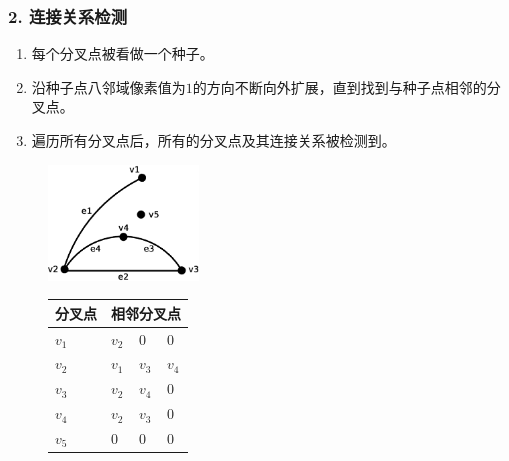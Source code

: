 \documentclass[notheorems,mathserif,table,compress]{beamer}  %
\begin{document}
\begin{frame}
\frametitle{2. 连接关系检测}
\begin{enumerate}
\item 每个分叉点被看做一个种子。
\item 沿种子点八邻域像素值为$1$的方向不断向外扩展，直到找到与种子点相邻的分叉点。
\item 遍历所有分叉点后，所有的分叉点及其连接关系被检测到。
\end{enumerate}
\begin{figure}
\begin{minipage}[b]{0.48\textwidth} 
      \centering 
      \includegraphics[width=4cm]{chap02/graph}
\caption*{\color{blue}{图}}
    \end{minipage}
\begin{minipage}[b]{0.48\textwidth} 
\begin{tabular}{p{1.2cm}<{\centering}p{0.5cm}<{\centering}p{0.5cm}<{\centering}p{0.5cm}<{\centering}}
  \hline
  分叉点 & \multicolumn{3}{c}{相邻分叉点}\\
  \hline
  \rowcolor{gray!50}
  $v_{1}$ & $v_{2}$  & $0$      & $0$  \\
  $v_{2}$ & $v_{1}$  & $v_{3}$  & $v_{4}$ \\
  \rowcolor{gray!50}
  $v_{3}$ & $v_{2}$  & $v_{4}$  & $0$\\
  $v_{4}$ & $v_{2}$  & $v_{3}$  & $0$ \\
  \rowcolor{gray!50}
  $v_{5}$ & $0$      & $0$      & $0$\\
  \hline
\end{tabular}
\caption*{\color{blue}{点---边关系}}
\end{minipage}
\end{figure}
\end{frame}
\end{document}
